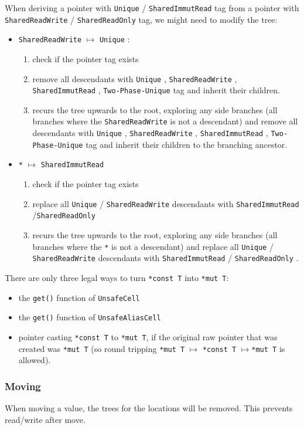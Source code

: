 \documentclass[]{article}
\newcommand{\SHRW}{\texttt{SharedReadWrite} }
\newcommand{\SHRO}{\texttt{SharedReadOnly} }
\newcommand{\SHIR}{\texttt{SharedImmutRead} }
\newcommand{\UNQ}{\texttt{Unique} }
\newcommand{\TPU}{\texttt{Two-Phase-Unique} }
\begin{document}
When deriving a pointer with \UNQ / \SHIR tag from a pointer with \SHRW / \SHRO tag, we might need to modify the tree:
\begin{itemize}
    \item \SHRW $\mapsto$ \UNQ:
    \begin{enumerate}
        \item check if the pointer tag exists
        \item remove all descendants with \UNQ, \SHRW, \SHIR, \TPU tag and inherit their children.
        \item recurs the tree upwards to the root, exploring any side branches (all branches where the \SHRW is not a descendant) and remove all descendants with \UNQ, \SHRW, \SHIR, \TPU tag and inherit their children to the branching ancestor.
    \end{enumerate}
    \item \texttt{*} $\mapsto$ \SHIR
    \begin{enumerate}
        \item check if the pointer tag exists
        \item replace all \UNQ/ \SHRW descendants with \SHIR/\SHRO
        \item recurs the tree upwards to the root, exploring any side branches (all branches where the \texttt{*} is not a descendant) and replace all \UNQ/ \SHRW descendants with \SHIR/ \SHRO.
    \end{enumerate}
\end{itemize}

\noindent There are only three legal ways to turn \texttt{*const T} into \texttt{*mut T}:
\begin{itemize}
    \item the \texttt{get()} function of \texttt{UnsafeCell}
    \item the \texttt{get()} function of \texttt{UnsafeAliasCell}
    \item pointer casting \texttt{*const T} to \texttt{*mut T}, if the original raw pointer that was created was \texttt{*mut T} (so round tripping \texttt{*mut T} $\mapsto$ \texttt{*const T} $\mapsto$\texttt{*mut T} is allowed).
\end{itemize}

\subsubsection{Moving}

When moving a value, the trees for the locations will be removed. This prevents read/write after move.
\end{document}

